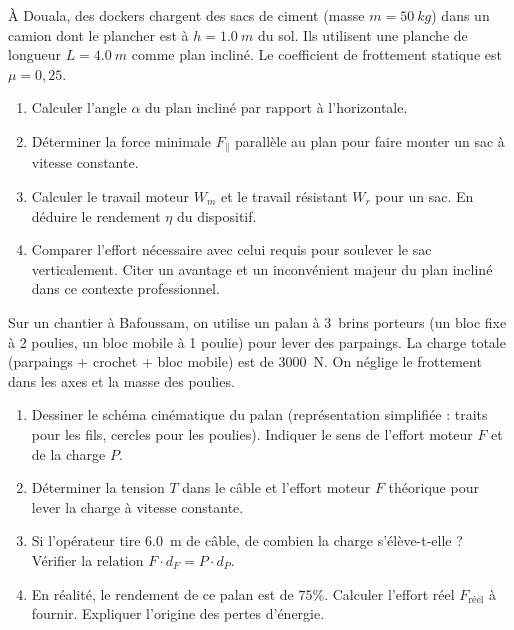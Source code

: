 \documentclass[11pt]{article}
\begin{document}
\begin{exercice}
À Douala, des dockers chargent des sacs de ciment (masse $m = \SI{50}{kg}$) dans un camion dont le plancher est à $h = \SI{1,0}{m}$ du sol. Ils utilisent une planche de longueur $L = \SI{4,0}{m}$ comme plan incliné. Le coefficient de frottement statique est $\mu = 0,25$.
\begin{enumerate}
    \item Calculer l'angle $\alpha$ du plan incliné par rapport à l'horizontale.
    \item Déterminer la force minimale $F_{\parallel}$ parallèle au plan pour faire monter un sac à vitesse constante.
    \item Calculer le travail moteur $W_m$ et le travail résistant $W_r$ pour un sac. En déduire le rendement $\eta$ du dispositif.
    \item Comparer l'effort nécessaire avec celui requis pour soulever le sac verticalement. Citer un avantage et un inconvénient majeur du plan incliné dans ce contexte professionnel.
\end{enumerate}
\end{exercice}

\begin{exercice}
Sur un chantier à Bafoussam, on utilise un palan à \SI{3}{brins} porteurs (un bloc fixe à 2 poulies, un bloc mobile à 1 poulie) pour lever des parpaings. La charge totale (parpaings + crochet + bloc mobile) est de \SI{3000}{N}. On néglige le frottement dans les axes et la masse des poulies.
\begin{enumerate}
    \item Dessiner le schéma cinématique du palan (représentation simplifiée : traits pour les fils, cercles pour les poulies). Indiquer le sens de l'effort moteur $F$ et de la charge $P$.
    \item Déterminer la tension $T$ dans le câble et l'effort moteur $F$ théorique pour lever la charge à vitesse constante.
    \item Si l'opérateur tire \SI{6,0}{m} de câble, de combien la charge s'élève-t-elle ? Vérifier la relation $F \cdot d_F = P \cdot d_P$.
    \item En réalité, le rendement de ce palan est de $75\%$. Calculer l'effort réel $F_{\text{réel}}$ à fournir. Expliquer l'origine des pertes d'énergie.
\end{enumerate}
\end{exercice}
\end{document}
